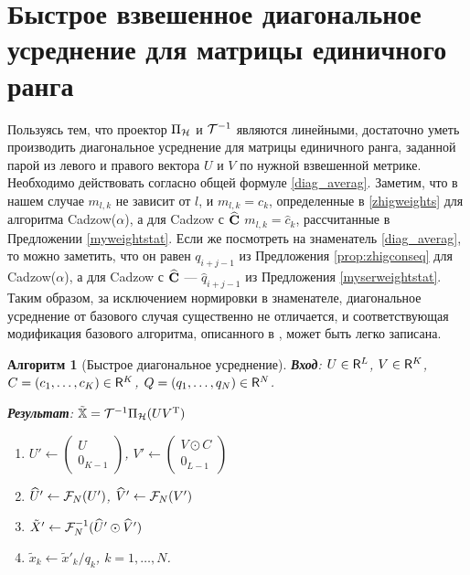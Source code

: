 \documentclass[12pt, specialist, subf,href,colorlinks=true,substylefile = spbu.rtx]{disser}
\newtheorem{algorithm}{Алгоритм}
\theoremstyle{remark}
\theoremstyle{definition}
\begin{document}
\section{Быстрое взвешенное диагональное усреднение для матрицы единичного ранга}
Пользуясь тем, что проектор $\Pi_{\mathcal{H}}$ и $\mathcal{T}^{-1}$ являются линейными, достаточно уметь производить диагональное усреднение для матрицы единичного ранга, заданной парой из левого и правого вектора $U$ и $V$ по нужной взвешенной метрике. Необходимо действовать согласно общей формуле \eqref{diag_averag}. Заметим, что в нашем случае $m_{l,k}$ не зависит от $l$, и $m_{l,k} = c_k$, определенные в \eqref{zhigweights} для алгоритма Cadzow($\alpha$), а для Cadzow с $\widehat {\mathbf{C}}$ $m_{l,k} = \hat c_k$, рассчитанные в Предложении \ref{myweightstat}. Если же посмотреть на знаменатель \eqref{diag_averag}, то можно заметить, что он равен $q_{i+j-1}$ из Предложения \ref{prop:zhigconseq} для Cadzow($\alpha$), а для Cadzow с $\widehat {\mathbf{C}}$ --- $\hat q_{i+j-1}$ из Предложения \ref{myserweightstat}. Таким образом, за исключением нормировки в знаменателе, диагональное усреднение от базового случая существенно не отличается, и соответствующая модификация базового алгоритма, описанного в \cite{Golyandina2013a}, может быть легко записана.
\begin{algorithm}[Быстрое диагональное усреднение]
	\textbf{Вход}: $U \in \mathsf{R}^L$, $V \in \mathsf{R}^K$, $C = (c_1, \ldots, c_K) \in \mathsf{R}^K$, $Q = (q_1, \ldots, q_N) \in \mathsf{R}^N$.
	
	\textbf{Результат}:
	$\tilde {\mathbb{X}} = \mathcal{T}^{-1}\Pi_{\mathcal{H}}(U V^{\mathrm{T}})$
	
	\begin{enumerate}
		\item
		$U' \leftarrow \begin{pmatrix}
		U \\ 
		0_{K-1}
		\end{pmatrix} $, $V' \leftarrow \begin{pmatrix}
		V \odot C \\ 
		0_{L-1}
		\end{pmatrix} $
		\item
		$\widehat U' \leftarrow \mathcal{F}_N(U')$, $\widehat V' \leftarrow \mathcal{F}_N(V')$
		\item
		$\tilde X' \leftarrow \mathcal{F}^{-1}_N (\widehat U' \odot \widehat V')$
		\item
		$\tilde x_k \leftarrow \tilde x'_k/q_k$, $k = 1, \ldots, N$.
	\end{enumerate}
\end{algorithm}
\end{document}
